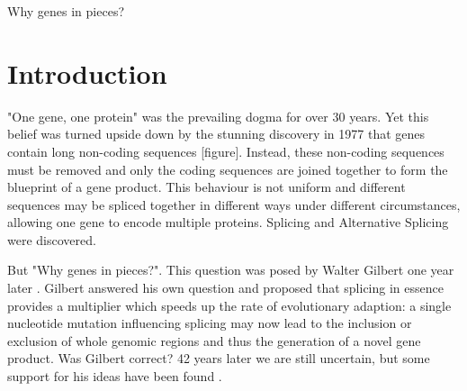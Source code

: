 \begin{savequote}[8cm]
Why genes in pieces?
\end{savequote}

\chapter{\label{ch:1-intro}Introduction} 
"One gene, one protein" was the prevailing dogma for over 30 years. Yet this belief was turned upside down by the stunning discovery in 1977 that genes contain long non-coding sequences \cite{discoveryofsplicing} [figure]. Instead, these non-coding sequences must be removed and only the coding sequences are joined together to form the blueprint of a gene product. This behaviour is not uniform and different sequences may be spliced together in different ways under different circumstances, allowing one gene to encode multiple proteins. Splicing and Alternative Splicing were discovered. 

%



But "Why genes in pieces?". This question was posed by Walter Gilbert one year later \cite{whygenesinpieces}. Gilbert answered his own question and proposed that splicing in essence provides a multiplier which speeds up the rate of evolutionary adaption: a single nucleotide mutation influencing splicing may now lead to the inclusion or exclusion of whole genomic regions and thus the generation of a novel gene product. Was Gilbert correct? 42 years later we are still uncertain, but some support for his ideas have been found \cite{whyrevisited}. %

